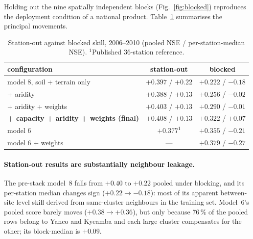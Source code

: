 \documentclass[11pt,a4paper]{article}
\begin{document}
Holding out the nine spatially independent blocks (Fig.~\ref{fig:blocked})
reproduces the deployment condition of a national product.
Table~\ref{tab:blocked-configs} summarises the principal movements.

\begin{table}[htbp]
\centering
\caption{Station-out against blocked skill, 2006--2010 (pooled NSE /
per-station-median NSE). $^{1}$Published 36-station reference.}
\label{tab:blocked-configs}
\small
\begin{tabular}{lcc}
\toprule
configuration & station-out & blocked \\
\midrule
model 8, soil + terrain only            & $+0.397$ / $+0.22$          & $+0.222$ / $-0.18$ \\
\quad + aridity                       & $+0.388$ / $+0.13$          & $+0.256$ / $-0.02$ \\
\quad + aridity + weights             & $+0.403$ / $+0.13$          & $+0.290$ / $-0.01$ \\
\textbf{\quad + capacity + aridity + weights (final)} & $\mathbf{+0.408}$ / $+0.13$ & $\mathbf{+0.322}$ / $\mathbf{+0.07}$ \\
\addlinespace
model 6                               & $+0.377^{1}$                & $+0.355$ / $-0.21$ \\
model 6 + weights                     & ---                         & $+0.379$ / $-0.27$ \\
\bottomrule
\end{tabular}
\end{table}

\paragraph{Station-out results are substantially neighbour leakage.} The
pre-stack model~8 falls from $+0.40$ to $+0.22$ pooled under blocking, and its
per-station median changes sign ($+0.22 \to -0.18$): most of its apparent
between-site level skill derived from same-cluster neighbours in the training
set. Model~6's pooled score barely moves ($+0.38 \to +0.36$), but only because
76\,\% of the pooled rows belong to Yanco and Kyeamba and each large cluster
compensates for the other; its block-median is $+0.09$.
\end{document}
